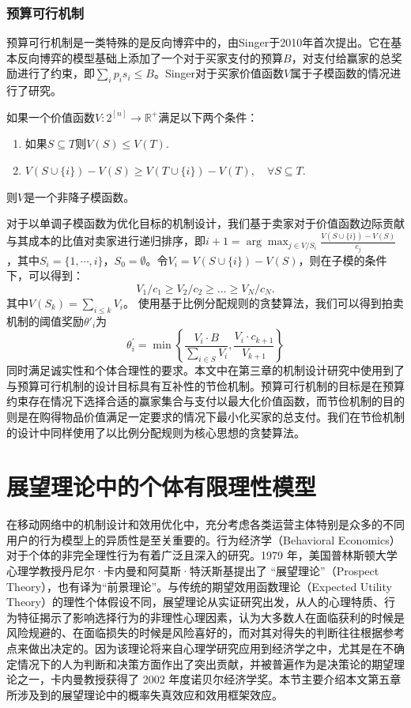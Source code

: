 \subsubsection{预算可行机制}
预算可行机制是一类特殊的是反向博弈中的，由Singer\cite{Singer}于2010年首次提出。它在基本反向博弈的模型基础上添加了一个对于买家支付的预算$B$，对支付给赢家的总奖励进行了约束，即$\sum_{i} p_{i} s_{i} \leq B$。Singer对于买家价值函数$V$属于子模函数的情况进行了研究。
\begin{df}
如果一个价值函数$V: 2^{[n]} \rightarrow \mathbb{R}^{+}$满足以下两个条件：
\begin{enumerate}
\item 如果$S \subseteq T$则$V(S) \leq V(T)$.
\item $V(S \cup\{i\})-V(S) \geq V(T \cup\{i\})-V(T), \quad \forall S \subseteq T$.
\end{enumerate}
则$V$是一个非降子模函数。
\end{df}

对于以单调子模函数为优化目标的机制设计，我们基于卖家对于价值函数边际贡献与其成本的比值对卖家进行递归排序，即$i+1=\arg\max_{j\in V/S_i}\frac{V(S\cup\{i\})-V(S)}{c_j}$，其中$S_i=\{1,\cdots,i\}$，$S_0=\emptyset$。令$V_i=V(S\cup\{i\})-V(S)$，则在子模的条件下，可以得到：
\begin{equation}
V_{1} / c_{1} \geq V_{2} / c_{2} \geq \ldots \geq V_{N} / c_{N}.
\end{equation}
其中$V\left(S_{k}\right)=\sum_{i \leq k} V_{i}$。
使用基于比例分配规则的贪婪算法，我们可以得到拍卖机制的阈值奖励$\theta'_i$为
\begin{equation}
\theta_{i}^{\prime}=\min \left\{\frac{V_{i} \cdot B}{\sum_{i \in S} V_{i}}, \frac{V_{i} \cdot c_{k+1}}{V_{k+1}}\right\}
\end{equation}
同时满足诚实性和个体合理性的要求。本文中在第三章的机制设计研究中使用到了与预算可行机制的设计目标具有互补性的节俭机制。预算可行机制的目标是在预算约束存在情况下选择合适的赢家集合与支付以最大化价值函数，而节俭机制的目的则是在购得物品价值满足一定要求的情况下最小化买家的总支付。我们在节俭机制的设计中同样使用了以比例分配规则为核心思想的贪婪算法。

\section{展望理论中的个体有限理性模型}\label{sec:setup}
在移动网络中的机制设计和效用优化中，充分考虑各类运营主体特别是众多的不同用户的行为模型上的异质性是至关重要的。行为经济学（Behavioral Economics）对于个体的非完全理性行为有着广泛且深入的研究。1979 年，美国普林斯顿大学心理学教授丹尼尔·卡内曼和阿莫斯·特沃斯基提出了 “展望理论”（Prospect Theory）\cite{Kahneman}，也有译为“前景理论”。与传统的期望效用函数理论（Expected Utility Theory）的理性个体假设不同，展望理论从实证研究出发，从人的心理特质、行为特征揭示了影响选择行为的非理性心理因素，认为大多数人在面临获利的时候是风险规避的、在面临损失的时候是风险喜好的，而对其对得失的判断往往根据参考点来做出决定的。因为该理论将来自心理学研究应用到经济学之中，尤其是在不确定情况下的人为判断和决策方面作出了突出贡献，并被普遍作为是决策论的期望理论之一，卡内曼教授获得了 2002 年度诺贝尔经济学奖。本节主要介绍本文第五章所涉及到的展望理论中的{\kaishu 概率失真效应}和{\kaishu 效用框架效应}。

